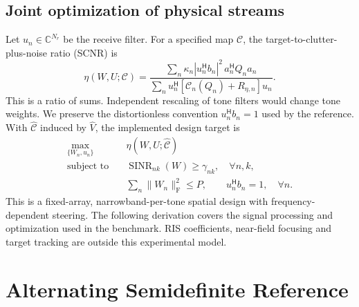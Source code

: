 \documentclass[journal]{IEEEtran}
\newcommand{\Hh}{^{\mathsf H}}
\newcommand{\F}{_{\mathrm F}}
\newcommand{\C}{\mathbb C}
\newcommand{\sn}{\operatorname{SINR}}
\newcommand{\norm}[1]{\lVert #1\rVert}
\begin{document}
\subsection{Joint optimization of physical streams}
Let $u_n\in\C^{N_r}$ be the receive filter. For a specified map $\mathcal C$, the target-to-clutter-plus-noise ratio (SCNR) is
\begin{equation}
 \eta(W,U;\mathcal C)=
 \frac{\sum_n\kappa_n|u_n\Hh b_n|^2\,a_n\Hh Q_na_n}
 {\sum_n u_n\Hh [\mathcal C_n(Q_n)+R_{\eta,n}]u_n}.
 \label{eq:ratio}
\end{equation}
This is a ratio of sums. Independent rescaling of tone filters would change tone weights. We preserve the distortionless convention $u_n\Hh b_n=1$ used by the reference. With $\widehat{\mathcal C}$ induced by $\widehat V$, the implemented design target is
\begin{subequations}\label{eq:p}
\begin{align}
 \max_{\{W_n,u_n\}}\quad &\eta(W,U;\widehat{\mathcal C})\\
 \text{subject to}\quad &\sn_{nk}(W)\ge\gamma_{nk},\quad \forall n,k,\\
 &\sum_n\norm{W_n}\F^2\le P,\qquad u_n\Hh b_n=1,\quad\forall n .
\end{align}
\end{subequations}
This is a fixed-array, narrowband-per-tone spatial design with frequency-dependent steering. The following derivation covers the signal processing and optimization used in the benchmark. RIS coefficients, near-field focusing and target tracking are outside this experimental model.

\section{Alternating Semidefinite Reference}
\end{document}
